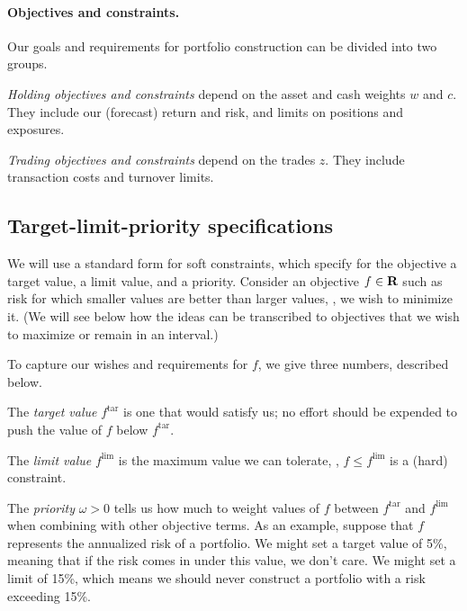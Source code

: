 \documentclass[12pt]{article}
\begin{document}
\paragraph{Objectives and constraints.}
Our goals and requirements for portfolio construction can be divided into
two groups.
\BIT
\item \emph{Holding objectives and constraints}
depend on the asset and cash weights $w$ and $c$.
They include our (forecast) return and risk, and
limits on positions and exposures.
\item \emph{Trading objectives and constraints}
depend on the trades $z$.
They include transaction costs and turnover limits.
\EIT




\subsection{Target-limit-priority specifications}
We will use a standard form for soft constraints, which specify for the objective
a target value, a limit value, and a priority.
Consider an objective $f\in {\mbox{\bf R}}$ such as risk for which
smaller values are better than larger values, \ie, we wish to minimize it.
(We will see below how the ideas can be transcribed to
objectives that we wish to maximize or remain in an interval.)

To capture our wishes and requirements for $f$, we give three
numbers, described below. 
\BIT
\item The \emph{target value} $f^\mathrm{tar}$ is one that would satisfy us;
no effort should be expended
to push the value of $f$ below $f^\mathrm{tar}$.
\item The \emph{limit value} $f^\mathrm{lim}$ is the maximum value we can tolerate, \ie,
$f \leq f^\mathrm{lim}$ is a (hard) constraint.
\item The \emph{priority} $\omega>0$ tells us how much to weight values of $f$
between $f^\mathrm{tar}$ and $f^\mathrm{lim}$ when combining with other
objective terms.
\EIT
As an example, suppose that $f$ represents the annualized risk of a portfolio.
We might set a target value of 5\%, meaning that if the risk comes in under 
this value, we don't care.  We might set a limit of 15\%, which means we should 
never construct a portfolio with a risk exceeding 15\%.
\end{document}
